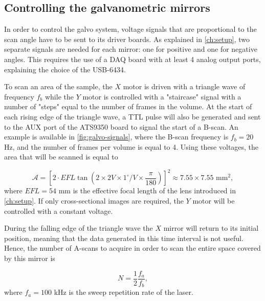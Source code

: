 \subsection{Controlling the galvanometric mirrors}
In order to control the galvo system, voltage signals that are proportional to the scan angle have to be sent to its driver boards. As explained in \autoref{ch:setup}, two separate signals are needed for each mirror: one for positive and one for negative angles. This requires the use of a \ac{DAQ} board with at least 4 analog output ports, explaining the choice of the USB-6434. 

To scan an area of the sample, the $X$ motor is driven with a triangle wave of frequency $f_b$ while the $Y$ motor is controlled with a "staircase" signal with a number of "steps" equal to the number of frames in the volume. At the start of each rising edge of the triangle wave, a TTL pulse will also be generated and sent to the AUX port of the ATS9350 board to signal the start of a B-scan. An example is available in \autoref{fig:galvo-signals}, where the B-scan frequency is $f_b = 20$ Hz, and the number of frames per volume is equal to 4. Using these voltages, the area that will be scanned is equal to 

\begin{equation}
	\mathcal{A} = \left[2\cdot EFL \tan\left( 2 \times 2 V \times 1  ^ \circ/V \times \frac{\pi}{180}\right)\right]^2 \approx 7.55\times 7.55 \text{ mm}^2,
\end{equation}
where $EFL = 54$ mm is the effective focal length of the lens introduced in \autoref{ch:setup}. 
If only cross-sectional images are required, the $Y$ motor will be controlled with a constant voltage. 

During the falling edge of the triangle wave the $X$ mirror will return to its initial position, meaning that the data generated in this time interval is not useful. Hence, the number of A-scans to acquire in order to scan the entire space covered by this mirror is

\begin{equation}\label{eq:bscan-maxwidth}
	N = \frac{1}{2} \frac{f_a}{f_b},
\end{equation}
where $f_a = 100$ kHz is the sweep repetition rate of the laser. 

